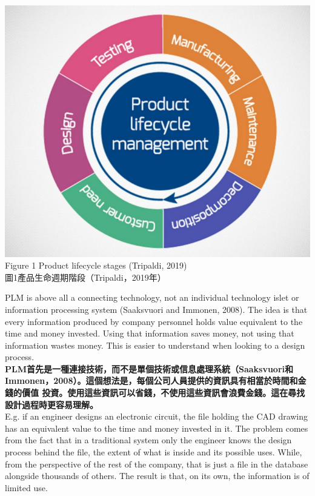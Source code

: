 \documentclass[24pt]{article} %
\begin{document}
\begin{center}
\includegraphics[width=15cm]{1.png}\\

Figure 1 Product lifecycle stages (Tripaldi, 2019)\\

圖1產品生命週期階段（Tripaldi，2019年）\\

\end{center}

PLM is above all a connecting technology, not an individual technology islet or information processing system (Saaksvuori and Immonen, 2008). The idea is that every information produced by company personnel holds value equivalent to the time and money invested. Using that information saves money, not using that information wastes money. This is easier to understand when looking to a design process.\\

\textbf{PLM首先是一種連接技術，而不是單個技術或信息處理系統（Saaksvuori和Immonen，2008）。這個想法是，每個公司人員提供的資訊具有相當於時間和金錢的價值 投資。使用這些資訊可以省錢，不使用這些資訊會浪費金錢。這在尋找設計過程時更容易理解。}\\

E.g. if an engineer designs an electronic circuit, the file holding the CAD drawing has an equivalent value to the time and money invested in it. The problem comes from the fact that in a traditional system only the engineer knows the design process behind the file, the extent of what is inside and its possible uses. While, from the perspective of the rest of the company, that is just a file in the database alongside thousands of others. The result is that, on its own, the information is of limited use.\\
\end{document}
